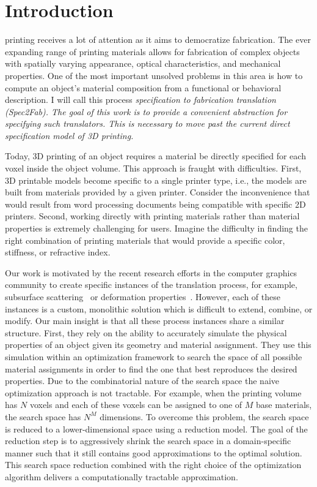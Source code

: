 
\renewcommand{\figdir}{figures/chap1}
%
\chapter{Introduction}
\label{chap:intro}
%
 printing receives a lot of attention as it aims to democratize fabrication.
The ever expanding range of printing materials allows for fabrication of complex objects with spatially varying appearance, optical characteristics, and mechanical properties.
One of the most important unsolved problems in this area is how to compute an object's material composition from a functional or behavioral description. I will call this process \em specification to fabrication translation (Spec2Fab). 
The goal of this work is to provide a convenient abstraction for specifying such translators. This is necessary to move past the current direct specification model of 3D printing.

Today,  3D printing of an object requires a material be directly specified for each voxel inside the object volume. This approach is fraught with difficulties. First, 3D printable models become specific to a single printer type, i.e., the models are built from materials provided by a given printer. Consider the inconvenience that would result from  word processing documents being compatible with specific 2D printers. Second, working directly with printing materials rather than material properties is extremely challenging for users. Imagine the difficulty in finding the right combination of printing materials that would provide a specific color, stiffness, or refractive index.

Our work is motivated by the recent research efforts in the computer graphics community to create specific instances of the translation process, for example, subsurface scattering~\cite{Hasan:2010:PRO,Dong:2010:FSS} or deformation properties~\cite{Bickel:2010:DAF}. However, each of these instances is a custom, monolithic solution which is difficult to extend, combine, or modify. Our main insight is that all these process instances share a similar structure. First, they rely on the ability to accurately simulate the physical properties of an object given its geometry and material assignment. They use this simulation within an optimization framework to search the space of all possible material assignments in order to find the one that best reproduces the desired properties. Due to the combinatorial nature of the search space the naive optimization approach is not tractable. For example, when the printing volume has $N$ voxels and each of these voxels can be assigned to one of $M$ base materials, the search space has $N^M$ dimensions. To overcome this problem, the search space is reduced to a lower-dimensional space using a reduction model. The goal of the reduction step is to aggressively shrink the search space in a domain-specific manner such that it still contains good approximations to the optimal solution. This search space reduction combined with the right choice of the optimization algorithm delivers a computationally tractable approximation.


